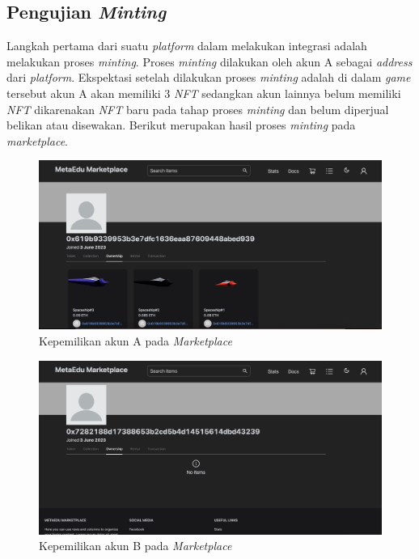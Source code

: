 \subsection{Pengujian \emph{Minting}}

Langkah pertama dari suatu \emph{platform} dalam melakukan integrasi adalah melakukan proses \emph{minting}. Proses \emph{minting} dilakukan oleh akun A sebagai \emph{address} dari \emph{platform}. Ekspektasi setelah dilakukan proses \emph{minting} adalah di dalam \emph{game} tersebut akun A akan memiliki 3 \emph{NFT} sedangkan akun lainnya belum memiliki \emph{NFT} dikarenakan \emph{NFT} baru pada tahap proses \emph{minting} dan belum diperjual belikan atau disewakan. Berikut merupakan hasil proses \emph{minting} pada \emph{marketplace}.

  \begin{figure} [H] \centering
            \includegraphics[scale=0.2]{gambar/img-test-integration-mint-profile-1.png}
            \caption{Kepemilikan akun A pada \emph{Marketplace}}
            \label{fig:TestIntegrationMintingProfile1}
        \end{figure}

  \begin{figure} [H] \centering
            \includegraphics[scale=0.2]{gambar/img-test-integration-mint-profile-2.png}
            \caption{Kepemilikan akun B pada \emph{Marketplace}}
            \label{fig:TestIntegrationMintingProfile2}
        \end{figure}
        

